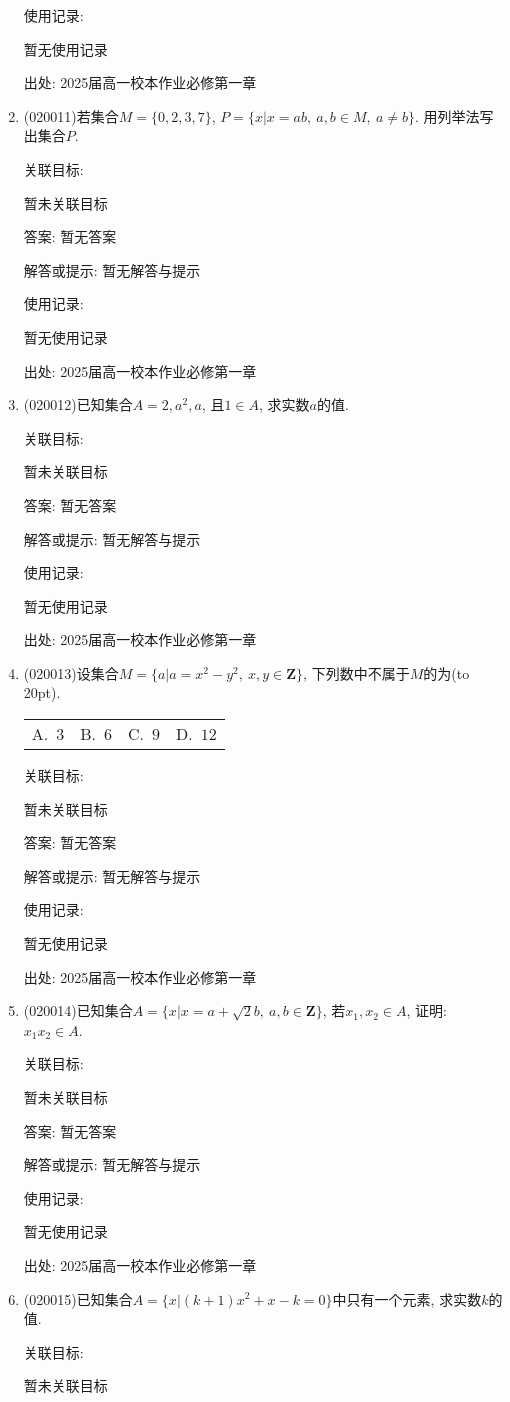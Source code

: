 \documentclass[10pt,a4paper]{article}
\newcommand{\bracket}[1]{(\hbox to #1pt{})}
\newcommand{\fourch}[4]{\par\begin{tabular}{p{.23\textwidth}p{.23\textwidth}p{.23\textwidth}p{.23\textwidth}}
A.~#1 &B.~#2& C.~#3& D.~#4
\end{tabular}}
\begin{document}
\begin{enumerate}[1.]
使用记录:

暂无使用记录


出处: 2025届高一校本作业必修第一章
\item { (020011)}若集合$M=\{0,2,3,7\}$, $P=\{x|x=ab,\ a,b\in M, \ a\ne b\}$. 用列举法写出集合$P$.


关联目标:

暂未关联目标

答案: 暂无答案

解答或提示: 暂无解答与提示

使用记录:

暂无使用记录


出处: 2025届高一校本作业必修第一章
\item { (020012)}已知集合$A={2, a^2, a}$, 且$1\in A$, 求实数$a$的值.


关联目标:

暂未关联目标

答案: 暂无答案

解答或提示: 暂无解答与提示

使用记录:

暂无使用记录


出处: 2025届高一校本作业必修第一章
\item { (020013)}设集合$M=\{a|a=x^2-y^2, \ x,y\in\mathbf{Z}\}$, 下列数中不属于$M$的为\bracket{20}.
\fourch{$3$}{$6$}{$9$}{$12$}


关联目标:

暂未关联目标

答案: 暂无答案

解答或提示: 暂无解答与提示

使用记录:

暂无使用记录


出处: 2025届高一校本作业必修第一章
\item { (020014)}已知集合$A=\{x|x=a+\sqrt 2b,\ a,b\in \mathbf{Z}\}$, 若$x_1,x_2\in A$, 证明: $x_1x_2\in A$.


关联目标:

暂未关联目标

答案: 暂无答案

解答或提示: 暂无解答与提示

使用记录:

暂无使用记录


出处: 2025届高一校本作业必修第一章
\item { (020015)}已知集合$A=\{x|(k+1)x^2+x-k=0\}$中只有一个元素, 求实数$k$的值.


关联目标:

暂未关联目标


\end{enumerate}
\end{document}

